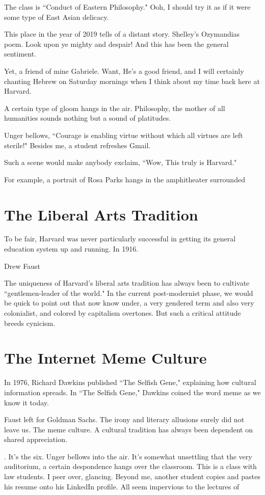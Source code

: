 \documentclass[12pt,letterpaper]{article}
\begin{document}
The class is ``Conduct of Eastern Philosophy."  Ooh, I should try it as if it were some type of East Asian delicacy.

This place in the year of 2019 tells of a distant story.  Shelley's Ozymandias poem.  Look upon ye mighty and despair!  And this has been the general sentiment.

Yet, a friend of mine Gabriele.  Want, He's a good friend, and I will certainly chanting Hebrew on Saturday mornings when I think about my time back here at Harvard.

A certain type of gloom hangs in the air.  Philosophy, the mother of all humanities sounds nothing but a sound of platitudes.  

Unger bellows, ``Courage is enabling virtue without which all virtues are left sterile!"  Besides me, a student refreshes Gmail.


 Such a scene would make anybody exclaim, ``Wow,  This truly is Harvard."

For example, a portrait of Rosa Parks hangs in the amphitheater surrounded 

\section{The Liberal Arts Tradition}
To be fair, Harvard was never particularly successful in getting its general education system up and running.  In 1916.

Drew Faust

The uniqueness of Harvard's liberal arts tradition has always been to cultivate ``gentlemen-leader of the world."  In the current post-modernist phase, we would be quick to point out that now know under, a very gendered term and also very colonialist, and colored by capitalism overtones.  But such a critical attitude breeds cynicism.

\section{The Internet Meme Culture}
In 1976, Richard Dawkins published ``The Selfish Gene," explaining how cultural information spreads.  In ``The Selfish Gene," Dawkins coined the word meme as we know it today.

Faust left for Goldman Sachs.  The irony and literary allusions surely did not leave us.  The meme culture.  A cultural tradition has always been dependent on shared appreciation.

.   It's the six.  Unger bellows into the air.  It's somewhat unsettling that the very auditorium, a certain despondence hangs over the classroom.  This is a class with law students.  I peer over, glancing.  Beyond me, another student copies and pastes his resume onto his LinkedIn profile.  All seem impervious to the lectures of 
\end{document}
